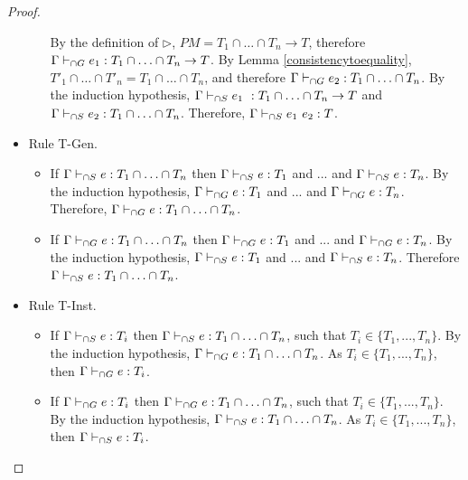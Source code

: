 \documentclass[a4paper]{article}
\begin{document}
\begin{proof}
\begin{itemize}
\begin{itemize}
        By the definition of $\rhd$, $PM = T_1 \cap \ldots \cap T_n \rightarrow T$, therefore $\Gamma \vdash_{\cap G} e_1 : T_1 \cap \ldots \cap T_n \rightarrow T$.
        By Lemma \ref{consistencytoequality}, $T'_1 \cap \ldots \cap T'_n = T_1 \cap \ldots \cap T_n$, and therefore $\Gamma \vdash_{\cap G} e_2 : T_1 \cap \ldots \cap T_n$.
        By the induction hypothesis, $\Gamma \vdash_{\cap S} e_1\ : T_1 \cap \ldots \cap T_n \rightarrow T$ and $\Gamma \vdash_{\cap S} e_2 : T_1 \cap \ldots \cap T_n$.
        Therefore, $\Gamma \vdash_{\cap S} e_1\ e_2 : T$.
    \end{itemize}
    \item Rule T-Gen.
    \begin{itemize}
        \item If $\Gamma \vdash_{\cap S} e : T_1 \cap \ldots \cap T_n$ then $\Gamma \vdash_{\cap S} e : T_1$ and ... and $\Gamma \vdash_{\cap S} e : T_n$.
        By the induction hypothesis, $\Gamma \vdash_{\cap G} e : T_1$ and ... and $\Gamma \vdash_{\cap G} e : T_n$.
        Therefore, $\Gamma \vdash_{\cap G} e : T_1 \cap \ldots \cap T_n$.
        \item If $\Gamma \vdash_{\cap G} e : T_1 \cap \ldots \cap T_n$ then $\Gamma \vdash_{\cap G} e : T_1$ and ... and $\Gamma \vdash_{\cap G} e : T_n$.
        By the induction hypothesis, $\Gamma \vdash_{\cap S} e : T_1$ and ... and $\Gamma \vdash_{\cap S} e : T_n$.
        Therefore $\Gamma \vdash_{\cap S} e : T_1 \cap \ldots \cap T_n$.
    \end{itemize}
    \item Rule T-Inst.
    \begin{itemize}
        \item If $\Gamma \vdash_{\cap S} e : T_i$ then $\Gamma \vdash_{\cap S} e : T_1 \cap \ldots \cap T_n$, such that $T_i \in \{T_1, ..., T_n\}$.
        By the induction hypothesis, $\Gamma \vdash_{\cap G} e : T_1 \cap \ldots \cap T_n$.
        As $T_i \in \{T_1, ..., T_n\}$, then $\Gamma \vdash_{\cap G} e : T_i$.
        \item If $\Gamma \vdash_{\cap G} e : T_i$ then $\Gamma \vdash_{\cap G} e : T_1 \cap \ldots \cap T_n$, such that $T_i \in \{T_1, ..., T_n\}$.
        By the induction hypothesis, $\Gamma \vdash_{\cap S} e : T_1 \cap \ldots \cap T_n$.
        As $T_i \in \{T_1, ..., T_n\}$, then $\Gamma \vdash_{\cap S} e : T_i$.
    \end{itemize}
\end{itemize}
\end{proof}
\end{document}
